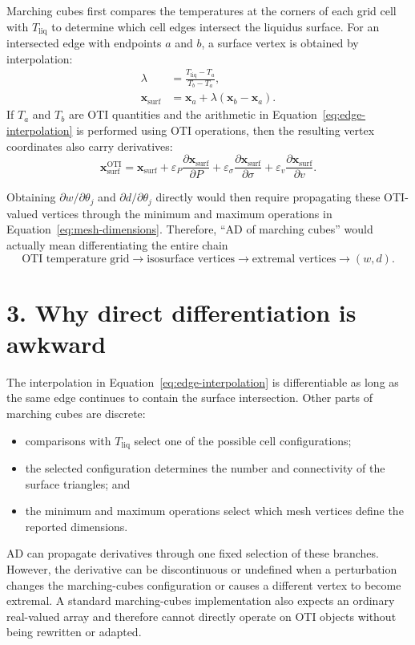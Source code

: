 \documentclass[12pt]{article}
\begin{document}
Marching cubes first compares the temperatures at the corners of each grid
cell with $T_{\mathrm{liq}}$ to determine which cell edges intersect the
liquidus surface. For an intersected edge with endpoints $a$ and $b$, a
surface vertex is obtained by interpolation:
\begin{align}
  \lambda
  &=\frac{T_{\mathrm{liq}}-T_a}{T_b-T_a},\\
  \mathbf{x}_{\mathrm{surf}}
  &=\mathbf{x}_a
    +\lambda(\mathbf{x}_b-\mathbf{x}_a).
  \label{eq:edge-interpolation}
\end{align}
If $T_a$ and $T_b$ are OTI quantities and the arithmetic in
Equation~\eqref{eq:edge-interpolation} is performed using OTI operations,
then the resulting vertex coordinates also carry derivatives:
\begin{equation}
  \mathbf{x}_{\mathrm{surf}}^{\mathrm{OTI}}
  =
  \mathbf{x}_{\mathrm{surf}}
  +\varepsilon_P
    \frac{\partial\mathbf{x}_{\mathrm{surf}}}{\partial P}
  +\varepsilon_\sigma
    \frac{\partial\mathbf{x}_{\mathrm{surf}}}{\partial\sigma}
  +\varepsilon_v
    \frac{\partial\mathbf{x}_{\mathrm{surf}}}{\partial v}.
\end{equation}

Obtaining $\partial w/\partial\theta_j$ and
$\partial d/\partial\theta_j$ directly would then require propagating these
OTI-valued vertices through the minimum and maximum operations in
Equation~\eqref{eq:mesh-dimensions}. Therefore, ``AD of marching cubes''
would actually mean differentiating the entire chain
\begin{equation}
  \boxed{
  \text{OTI temperature grid}
  \longrightarrow
  \text{isosurface vertices}
  \longrightarrow
  \text{extremal vertices}
  \longrightarrow
  (w,d)}.
\end{equation}

\section*{3. Why direct differentiation is awkward}

The interpolation in Equation~\eqref{eq:edge-interpolation} is differentiable
as long as the same edge continues to contain the surface intersection. Other
parts of marching cubes are discrete:
\begin{itemize}
  \item comparisons with $T_{\mathrm{liq}}$ select one of the possible cell
        configurations;
  \item the selected configuration determines the number and connectivity of
        the surface triangles; and
  \item the minimum and maximum operations select which mesh vertices define
        the reported dimensions.
\end{itemize}
AD can propagate derivatives through one fixed selection of these branches.
However, the derivative can be discontinuous or undefined when a perturbation
changes the marching-cubes configuration or causes a different vertex to
become extremal. A standard marching-cubes implementation also expects an
ordinary real-valued array and therefore cannot directly operate on OTI
objects without being rewritten or adapted.
\end{document}
